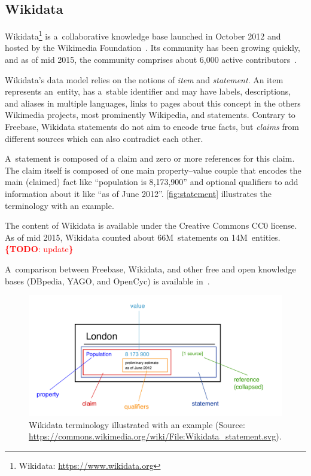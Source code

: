 \documentclass{acm_proc_article-sp}
\newcommand{\todo}[1]{\noindent\textcolor{red}{{\bf \{TODO}: #1{\bf \}}}}
\begin{document}
\subsection{Wikidata}

Wikidata\footnote{Wikidata: \url{https://www.wikidata.org}}
is a~collaborative knowledge base
launched in October 2012 and hosted by the Wikimedia Foundation~\cite{vrandevcic2014wikidata}.
Its community has been growing quickly, and as of mid 2015,
the community comprises about 6,000 active contributors~\cite{wikidatastats}.

Wikidata's data model relies on the notions of \emph{item} and \emph{statement}.
An item represents an~entity, has a~stable identifier and may have labels,
descriptions, and aliases in multiple languages, links to pages about this concept
in the others Wikimedia projects, most prominently Wikipedia, and statements.
Contrary to Freebase, Wikidata statements do not aim to encode true facts,
but \emph{claims} from different sources which can also contradict each other.

A~statement is composed of a claim and zero or more references for this claim.
The claim itself is composed of one main property--value couple that encodes
the main (claimed) fact like ``population is 8,173,900'' and optional qualifiers
to add information about it like ``as of June 2012''.
\autoref{fig:statement} illustrates the terminology with an example.

The content of Wikidata is available under the Creative Commons CC0 license.
As of mid 2015, Wikidata counted about 66M~statements on 14M~entities. \todo{update}

A~comparison between Freebase, Wikidata, and other free and open knowledge bases
(DBpedia, YAGO, and OpenCyc) is available in~\cite{farbercomparative}.

\begin{figure}[!htbp]
\centering
\includegraphics[width=8.45 cm]{img/Wikidata_statement.pdf}
\caption{Wikidata terminology illustrated with an example (Source:
	\url{https://commons.wikimedia.org/wiki/File:Wikidata_statement.svg}).}
\label{fig:statement}
\end{figure}
\end{document}
